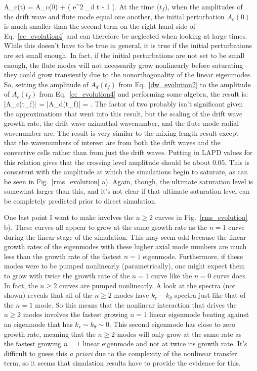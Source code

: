 A_c(t) = A_c(0) +  \left( e^{2 \gamma_d t} - 1  \right).
\eeq
At the time ($t_f$), when the amplitudes of the drift wave and flute mode equal one another, the initial perturbation $A_c(0)$ is much smaller than the second term on the right hand side
of Eq.~\ref{cc_evolution4} and can therefore be neglected when looking at large times. While this doesn't have to be true in general, it is true if the initial perturbations are set small enough.
In fact, if the initial perturbations are not set to be small enough, the flute modes will not necessarily grow nonlinearly before saturating -- they could grow transiently due to the
nonorthogonality of the linear eigenmodes.
So, setting the amplitude of $A_d(t_f)$ from Eq.~\ref{dw_evolution2} to the amplitude of 
$A_c(t_f)$ from Eq.~\ref{cc_evolution4} and performing some algebra, the result is:
\beq
\label{dw_cc_scaling}
|A_c(t_f)| = |A_d(t_f)| = .
\eeq
The factor of two probably isn't significant given the approximations that went into this result, but the scaling of the drift wave growth rate, the drift wave azimuthal wavenumber,
and the flute mode radial wavenumber are. The result is very similar to the mixing length result except that the wavenumbers of interest are from both the drift waves and the
convective cells rather than from just the drift waves. Putting in LAPD values for this relation gives that the crossing level amplitude should be about $0.05$. This is consistent
with the amplitude at which the simulations begin to saturate, as can be seen in Fig.~\ref{rms_evolution} a). Again, though, the ultimate saturation level is somewhat larger than this,
and it's not clear if that ultimate saturation level can be completely predicted prior to direct simulation.

One last point I want to make involves the $n \ge 2$ curves in Fig.~\ref{rms_evolution} b). These curves all appear to grow at the same growth rate as the $n=1$ curve during the linear
stage of the simulation. This may seem odd because the linear growth rates of the eigenmodes with these higher axial mode numbers are much less than the growth rate of the fastest
$n=1$ eigenmode. Furthermore, if these modes were to be pumped nonlinearly (parametrically), one might expect them to grow with twice the growth rate of the $n=1$ curve like the
$n=0$ curve does. In fact, the $n \ge 2$ curves are pumped nonlinearly. A look at the spectra (not shown) reveals that all of the $n \ge 2$ modes have $k_r-k_\theta$ spectra
just like that of the $n=1$ mode. So this means that the nonlinear interaction that drives the $n \ge 2$ modes involves the fastest growing $n=1$ linear eigenmode beating against an eigenmode
that has $k_r \sim k_\theta \sim 0$. This second eigenmode has close to zero growth rate, meaning that the $n \ge 2$ modes will only grow at the same rate as the fastest growing
$n=1$ linear eigenmode and not at twice its growth rate. It's difficult to guess this \emph{a priori} due to the complexity of the nonlinear transfer term, so it seems that simulation
results have to provide the evidence for this.
